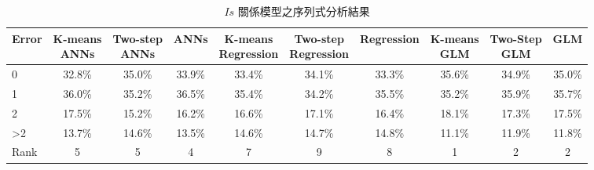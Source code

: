 

{\renewcommand{\arraystretch}{1.5}
\begin{table}[hbtp]
  \begin{center}
    \caption{$Is$ 關係模型之序列式分析結果}
    \label{tab:is_seq_result}
    \scriptsize
    \begin{tabular}{l c c c c c c c c c}
      \hline
       Error & \specialcell{K-means \\ ANNs} & \specialcell{Two-step \\ ANNs} & ANNs & \specialcell{K-means \\ Regression} & \specialcell{Two-step \\ Regression} & Regression & \specialcell{K-means \\ GLM}  & \specialcell{Two-Step \\ GLM} & GLM \\
      \hline
	   0  & 32.8\% & 35.0\% & 33.9\% & 33.4\% & 34.1\% & 33.3\% & 35.6\% & 34.9\% & 35.0\% \\
	   1  & 36.0\% & 35.2\% & 36.5\% & 35.4\% & 34.2\% & 35.5\% & 35.2\% & 35.9\% & 35.7\% \\
	   2  & 17.5\% & 15.2\% & 16.2\% & 16.6\% & 17.1\% & 16.4\% & 18.1\% & 17.3\% & 17.5\% \\
	   >2 & 13.7\% & 14.6\% & 13.5\% & 14.6\% & 14.7\% & 14.8\% & 11.1\% & 11.9\% & 11.8\% \\
      \hline
      Rank & 5 & 5 & 4 & 7 & 9 & 8 & 1 & 2 & 2 \\
      \hline
      \end{tabular}
  \end{center}
\end{table}
}

















